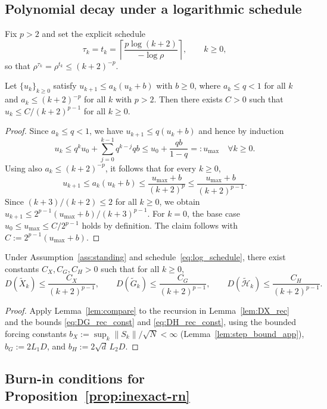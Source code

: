\documentclass[review,onefignum,onetabnum]{siamart171218}
\begin{document}
\subsection{Polynomial decay under a logarithmic schedule}

Fix $p>2$ and set the explicit schedule
\begin{equation}\label{eq:log_schedule}
\tau_k=t_k=\left\lceil \frac{p\log(k+2)}{-\log\rho}\right\rceil,\qquad k\ge 0,
\end{equation}
so that $\rho^{\tau_k}=\rho^{t_k}\le (k+2)^{-p}$.

\begin{lemma}\label{lem:compare}
Let $\{u_k\}_{k\ge0}$ satisfy $u_{k+1}\le a_k(u_k+b)$ with $b\ge0$, where
$a_k\le q<1$ for all $k$ and $a_k\le (k+2)^{-p}$ for all $k$ with $p>2$.
Then there exists $C>0$ such that $u_k\le C/(k+2)^{p-1}$ for all $k\ge0$.
\end{lemma}
\begin{proof}
Since $a_k\le q<1$, we have $u_{k+1}\le q(u_k+b)$ and hence by induction
\[
u_k\le q^k u_0+\sum_{j=0}^{k-1} q^{k-j}qb \le u_0+\frac{qb}{1-q}=:u_{\max}\quad \forall k\ge 0.
\]
Using also $a_k\le (k+2)^{-p}$, it follows that for every $k\ge 0$,
\[
u_{k+1}\le a_k(u_k+b)\le \frac{u_{\max}+b}{(k+2)^{p}}\le \frac{u_{\max}+b}{(k+2)^{p-1}}.
\]
Since $(k+3)/(k+2)\le 2$ for all $k\ge 0$, we obtain
$u_{k+1}\le 2^{p-1}(u_{\max}+b)/(k+3)^{p-1}$.
For $k=0$, the base case $u_0\le u_{\max}\le C/2^{p-1}$ holds by definition.
The claim follows with $C:=2^{p-1}(u_{\max}+b)$.
\end{proof}

\begin{proposition}\label{prop:dispersion_decay}
Under Assumption~\ref{ass:standing} and schedule~\eqref{eq:log_schedule},
there exist constants $C_X,C_G,C_H>0$ such that for all $k\ge0$,
\[
D(\tilde X_k)\le \frac{C_X}{(k+2)^{p-1}},
\qquad
D(\tilde G_k)\le \frac{C_G}{(k+2)^{p-1}},
\qquad
D(\tilde{\mathcal H}_k)\le \frac{C_H}{(k+2)^{p-1}}.
\]
\end{proposition}
\begin{proof}
Apply Lemma~\ref{lem:compare} to the recursion in Lemma~\ref{lem:DX_rec} and the bounds \eqref{eq:DG_rec_const} and \eqref{eq:DH_rec_const},
using the bounded forcing constants $b_X:=\sup_k\|S_k\|/\sqrt N<\infty$ (Lemma~\ref{lem:step_bound_app}),
$b_G:=2L_1D$, and $b_H:=2\sqrt d\,L_2D$.
\end{proof}

\subsection{Burn-in conditions for Proposition~\ref{prop:inexact-rn}}
\end{document}
